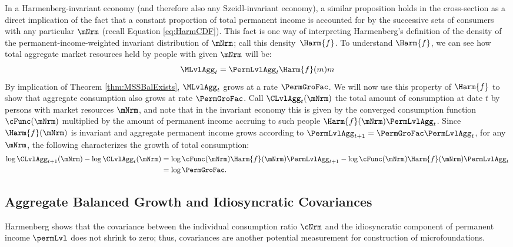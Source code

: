 \documentclass[BufferStockTheory]{subfiles}
\begin{document}
In a Harmenberg-invariant economy (and therefore also any Szeidl-invariant economy), a similar proposition holds in the cross-section as a direct implication of the fact that a constant proportion of total permanent income is accounted for by the successive sets of consumers with any particular $\mNrm$ (recall Equation \eqref{eq:HarmCDF}). This fact is one way of interpreting Harmenberg's definition of the density of the permanent-income-weighted invariant distribution of $\mNrm$; call this density~$\Harm{f}$. To understand $\Harm{f}$, we can see how total aggregate market resources held by people with given $\mNrm$ will be:
%
%
\begin{equation}
\MLvlAgg_{t}=\PermLvlAgg_{t}\Harm{f}(m)m
\end{equation}
%
%
By implication of Theorem \ref{thm:MSSBalExists}, $\MLvlAgg_{t}$ grows at a rate $\PermGroFac$. We will now use this property of $\Harm{f}$ to show that aggregate consumption also grows at rate $\PermGroFac$. Call $\CLvlAgg_{t}(\mNrm)$ the total amount of consumption at date $t$ by persons with market resources $\mNrm$, and note that in the invariant economy this is given by the converged consumption function $\cFunc(\mNrm)$ multiplied by the amount of permanent income accruing to such people $\Harm{f}(\mNrm)\PermLvlAgg_{t}$.  Since $\Harm{f}(\mNrm)$ is invariant and aggregate permanent income grows according to $\PermLvlAgg_{t+1} = \PermGroFac \PermLvlAgg_{t}$, for any $\mNrm$, the following characterizes the growth of total consumption:
%
%
\begin{equation*}
  \begin{split}
    \log \CLvlAgg_{t+1}(\mNrm) - \log \CLvlAgg_{t}(\mNrm) &  \notag
    = \log \cFunc(\mNrm) \Harm{f}(\mNrm)\PermLvlAgg_{t+1} - \log \cFunc(\mNrm)\Harm{f}(\mNrm)\PermLvlAgg_{t} \\
    & = \log \PermGroFac.
  \end{split}
\end{equation*}



\hypertarget{Balanced-Growth-Of-Covariances}{}
\subsection{Aggregate Balanced Growth and Idiosyncratic Covariances}\label{subsec:Covariances}

Harmenberg shows that the covariance between the individual consumption ratio $\cNrm$ and the idiosyncratic component of permanent income $\permLvl$ does not shrink to zero; thus, covariances are another potential measurement for construction of microfoundations.  %
\end{document}

